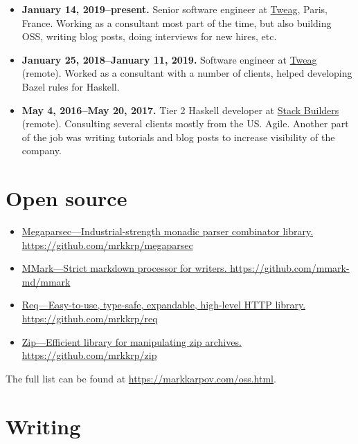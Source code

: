 \documentclass[a4paper,12pt]{article}
\begin{document}
\begin{itemize}[noitemsep]
\item \textbf{January 14, 2019--present.} Senior software engineer at
  \href{https://tweag.io}{Tweag}, Paris, France. Working as a consultant
  most part of the time, but also building OSS, writing blog posts, doing
  interviews for new hires, etc.
\item \textbf{January 25, 2018--January 11, 2019.} Software engineer at
  \href{https://tweag.io}{Tweag} (remote). Worked as a consultant with a
  number of clients, helped developing Bazel rules for Haskell.
\item \textbf{May 4, 2016--May 20, 2017.} Tier 2 Haskell developer at
  \href{https://www.stackbuilders.com/}{Stack Builders} (remote). Consulting
  several clients mostly from the US. Agile. Another part of the job was
  writing tutorials and blog posts to increase visibility of the company.
\end{itemize}

\section*{Open source}

\begin{itemize}[noitemsep]
\item \href{https://github.com/mrkkrp/megaparsec}
  {Megaparsec---Industrial-strength monadic parser combinator library.
    \newline
    https://github.com/mrkkrp/megaparsec}
\item \href{https://github.com/mmark-md/mmark}
  {MMark---Strict markdown processor for writers.
    \newline
    https://github.com/mmark-md/mmark}
\item \href{https://github.com/mrkkrp/req}
  {Req---Easy-to-use, type-safe, expandable, high-level HTTP library.
    \newline
    https://github.com/mrkkrp/req}
\item \href{https://github.com/mrkkrp/zip}
  {Zip---Efficient library for manipulating zip archives.
    \newline
    https://github.com/mrkkrp/zip}
\end{itemize}

The full list can be found at \href{https://markkarpov.com/oss.html}{https://markkarpov.com/oss.html}.

\pagebreak

\section*{Writing}
\end{document}
